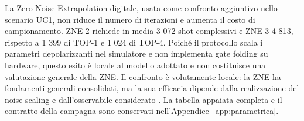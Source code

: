 La Zero-Noise Extrapolation digitale, usata come confronto aggiuntivo nello scenario UC1, non riduce il numero di iterazioni e aumenta il costo di campionamento. ZNE-2 richiede in media 3 072 shot complessivi e ZNE-3 4 813, rispetto a 1 399 di TOP-1 e 1 024 di TOP-4. Poiché il protocollo scala i parametri depolarizzanti nel simulatore e non implementa gate folding su hardware, questo esito è locale al modello adottato e non costituisce una valutazione generale della ZNE. Il confronto è volutamente locale: la ZNE ha fondamenti generali consolidati, ma la sua efficacia dipende dalla realizzazione del noise scaling e dall'osservabile considerato \cite{temme2017,liBenjamin2017}. La tabella appaiata completa e il contratto della campagna sono conservati nell'Appendice~\ref{app:parametrica}.

\iffalse
\begingroup
\small
